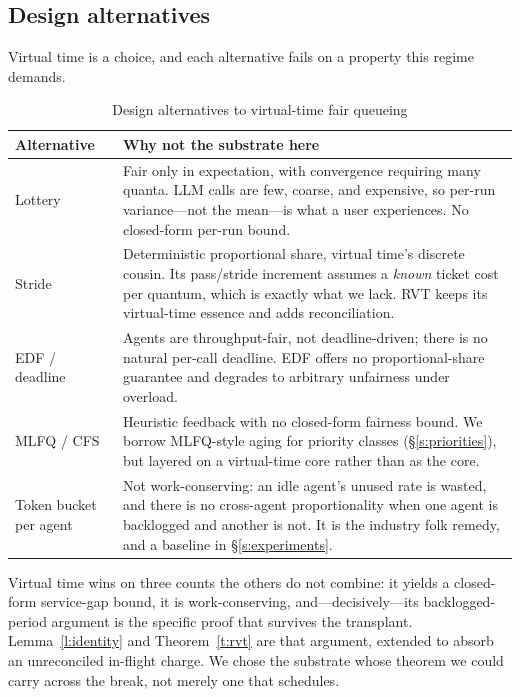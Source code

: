 \documentclass[letterpaper,11pt,leqno]{article}
\begin{document}
\subsection{Design alternatives}\label{s:alternatives}

Virtual time is a choice, and each alternative fails on a property this regime demands.

\begin{table}[t]
\caption{Design alternatives to virtual-time fair queueing}
\label{t:alternatives}
\begin{tabular*}{\textwidth}{p{2.8cm}@{\extracolsep\fill}p{10.2cm}}
\toprule
Alternative & Why not the substrate here \\
\midrule
Lottery \citep{Waldspurger94} & Fair only in expectation, with convergence requiring many quanta. LLM calls are few, coarse, and expensive, so per-run variance---not the mean---is what a user experiences. No closed-form per-run bound. \\
Stride \citep{Waldspurger95} & Deterministic proportional share, virtual time's discrete cousin. Its pass/stride increment assumes a \emph{known} ticket cost per quantum, which is exactly what we lack. RVT keeps its virtual-time essence and adds reconciliation. \\
EDF / deadline & Agents are throughput-fair, not deadline-driven; there is no natural per-call deadline. EDF offers no proportional-share guarantee and degrades to arbitrary unfairness under overload. \\
MLFQ / CFS & Heuristic feedback with no closed-form fairness bound. We borrow MLFQ-style aging for priority classes (\S\ref{s:priorities}), but layered on a virtual-time core rather than as the core. \\
Token bucket per agent & Not work-conserving: an idle agent's unused rate is wasted, and there is no cross-agent proportionality when one agent is backlogged and another is not. It is the industry folk remedy, and a baseline in \S\ref{s:experiments}. \\
\bottomrule
\end{tabular*}
\end{table}

Virtual time wins on three counts the others do not combine: it yields a closed-form service-gap bound, it is work-conserving, and---decisively---its backlogged-period argument is the specific proof that survives the transplant. Lemma~\ref{l:identity} and Theorem~\ref{t:rvt} are that argument, extended to absorb an unreconciled in-flight charge. We chose the substrate whose theorem we could carry across the break, not merely one that schedules.
\end{document}
